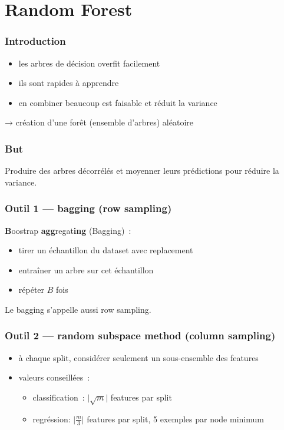 \documentclass{formation}
\begin{document}
\section{Random Forest}

\begin{frame}
  \frametitle{Introduction}
  \begin{itemize}
  \item les arbres de décision overfit facilement
  \item ils sont rapides à apprendre
  \item en combiner beaucoup est faisable et réduit la variance
  \end{itemize}

  → création d'une forêt (ensemble d'arbres) aléatoire
\end{frame}

\begin{frame}
  \frametitle{But}
  Produire des arbres décorrélés et moyenner leurs prédictions pour
  réduire la variance.
\end{frame}

\begin{frame}
  \frametitle{Outil 1 — bagging (row sampling)}

  \textbf{B}oostrap \textbf{agg}regat\textbf{ing} (Bagging) :

  \begin{itemize}
  \item tirer un échantillon du dataset avec replacement
  \item entraîner un arbre sur cet échantillon
  \item répéter $B$ fois
  \end{itemize}

  Le bagging s'appelle aussi row sampling.

\end{frame}

\begin{frame}
  \frametitle{Outil 2 — random subspace method (column sampling)}

  \begin{itemize}
  \item à chaque split, considérer seulement un sous-ensemble des
    features
  \item valeurs conseillées :
    \begin{itemize}
    \item classification : $\lvert\sqrt m\rvert$ features par split
    \item regréssion: $\lvert\frac{m}{3}\rvert$ features par split, 5
      exemples par node minimum
    \end{itemize}
  \end{itemize}
\end{frame}
\end{document}
